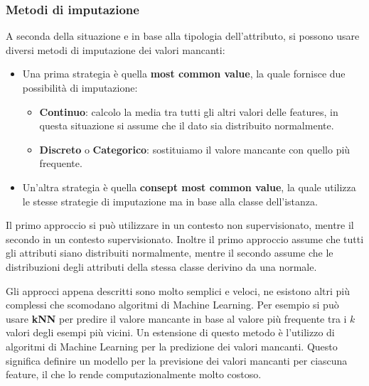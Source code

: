 \subsubsection{Metodi di imputazione}
A seconda della situazione e in base alla tipologia dell'attributo, si possono
usare diversi metodi di imputazione dei valori mancanti:
\begin{itemize}
      \item Una prima strategia è quella \textbf{most common value}, la quale
            fornisce due possibilità di imputazione:
            \begin{itemize}
                  \item \textbf{Continuo}: calcolo la media tra tutti gli altri
                        valori delle features, in questa situazione si assume che il
                        dato sia distribuito normalmente.
                  \item \textbf{Discreto} o \textbf{Categorico}: sostituiamo il valore
                        mancante con quello più frequente.
            \end{itemize}
      \item Un'altra strategia è quella \textbf{consept most common value}, la quale utilizza le stesse
            strategie di imputazione ma in base alla classe dell'istanza.
\end{itemize}
Il primo approccio si può utilizzare in un contesto non supervisionato, mentre il
secondo in un contesto supervisionato. Inoltre il primo approccio assume che tutti 
gli attributi siano distribuiti normalmente, mentre il secondo assume che le
distribuzioni degli attributi della stessa classe derivino da una normale.

Gli approcci appena descritti sono molto semplici e veloci, ne esistono altri più
complessi che scomodano algoritmi di Machine Learning. Per esempio si può usare
\textbf{kNN} per predire il valore mancante in base al valore più frequente tra
i $k$ valori degli esempi più vicini. Un estensione di questo metodo è l'utilizzo
di algoritmi di Machine Learning per la predizione dei valori mancanti. Questo
significa definire un modello per la previsione dei valori mancanti per ciascuna
feature, il che lo rende computazionalmente molto costoso.

